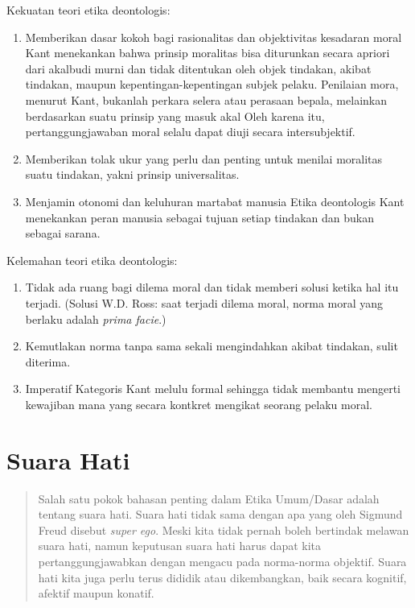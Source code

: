 \documentclass[11pt,twoside,a5paper,openany]{memoir}
\def\tightlist{}
\begin{document}
Kekuatan teori etika deontologis:

\begin{enumerate}
\def\labelenumi{\arabic{enumi}.}
\tightlist
\item
  Memberikan dasar kokoh bagi rasionalitas dan objektivitas kesadaran
  moral Kant menekankan bahwa prinsip moralitas bisa diturunkan secara
  apriori dari akalbudi murni dan tidak ditentukan oleh objek tindakan,
  akibat tindakan, maupun kepentingan-kepentingan subjek pelaku.
  Penilaian mora, menurut Kant, bukanlah perkara selera atau perasaan
  bepala, melainkan berdasarkan suatu prinsip yang masuk akal Oleh
  karena itu, pertanggungjawaban moral selalu dapat diuji secara
  intersubjektif.
\item
  Memberikan tolak ukur yang perlu dan penting untuk menilai moralitas
  suatu tindakan, yakni prinsip universalitas.
\item
  Menjamin otonomi dan keluhuran martabat manusia Etika deontologis Kant
  menekankan peran manusia sebagai tujuan setiap tindakan dan bukan
  sebagai sarana.
\end{enumerate}

Kelemahan teori etika deontologis:

\begin{enumerate}
\def\labelenumi{\arabic{enumi}.}
\tightlist
\item
  Tidak ada ruang bagi dilema moral dan tidak memberi solusi ketika hal
  itu terjadi. (Solusi W.D. Ross: saat terjadi dilema moral, norma moral
  yang berlaku adalah \emph{prima facie}.)
\item
  Kemutlakan norma tanpa sama sekali mengindahkan akibat tindakan, sulit
  diterima.
\item
  Imperatif Kategoris Kant melulu formal sehingga tidak membantu
  mengerti kewajiban mana yang secara kontkret mengikat seorang pelaku
  moral.
\end{enumerate}

\hypertarget{suara-hati}{%
\section{Suara Hati}\label{suara-hati}}

\begin{quote}
Salah satu pokok bahasan penting dalam Etika Umum/Dasar adalah tentang
suara hati. Suara hati tidak sama dengan apa yang oleh Sigmund Freud
disebut \emph{super ego}. Meski kita tidak pernah boleh bertindak
melawan suara hati, namun keputusan suara hati harus dapat kita
pertanggungjawabkan dengan mengacu pada norma-norma objektif. Suara hati
kita juga perlu terus dididik atau dikembangkan, baik secara kognitif,
afektif maupun konatif.
\end{quote}
\end{document}
